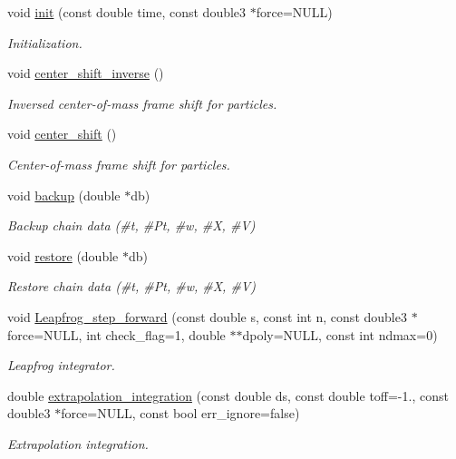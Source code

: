 \begin{DoxyCompactItemize}
void \hyperlink{classARC_1_1chain_aa016cf633d19079dca24565b80a36a3f}{init} (const double time, const double3 $\ast$force=N\+U\+LL)
\begin{DoxyCompactList}\small\item\em Initialization. \end{DoxyCompactList}\item 
void \hyperlink{classARC_1_1chain_a52edc1843550578f5be5590b7403ef97}{center\+\_\+shift\+\_\+inverse} ()
\begin{DoxyCompactList}\small\item\em Inversed center-\/of-\/mass frame shift for particles. \end{DoxyCompactList}\item 
void \hyperlink{classARC_1_1chain_a68ae268afb418455bfdd6e8101b3b4eb}{center\+\_\+shift} ()
\begin{DoxyCompactList}\small\item\em Center-\/of-\/mass frame shift for particles. \end{DoxyCompactList}\item 
void \hyperlink{classARC_1_1chain_a587009b6c6db0490c0f335aba732d77a}{backup} (double $\ast$db)
\begin{DoxyCompactList}\small\item\em Backup chain data (\#t, \#\+Pt, \#w, \#X, \#V) \end{DoxyCompactList}\item 
void \hyperlink{classARC_1_1chain_a2e7873b3a50ba9276d9a7595cb1d768d}{restore} (double $\ast$db)
\begin{DoxyCompactList}\small\item\em Restore chain data (\#t, \#\+Pt, \#w, \#X, \#V) \end{DoxyCompactList}\item 
void \hyperlink{classARC_1_1chain_a82b26731761231d86fd2e0b4529df6fa}{Leapfrog\+\_\+step\+\_\+forward} (const double s, const int n, const double3 $\ast$force=N\+U\+LL, int check\+\_\+flag=1, double $\ast$$\ast$dpoly=N\+U\+LL, const int ndmax=0)
\begin{DoxyCompactList}\small\item\em Leapfrog integrator. \end{DoxyCompactList}\item 
double \hyperlink{classARC_1_1chain_a0eb7768cb1b9099bbf66124d4c00164c}{extrapolation\+\_\+integration} (const double ds, const double toff=-\/1., const double3 $\ast$force=N\+U\+LL, const bool err\+\_\+ignore=false)
\begin{DoxyCompactList}\small\item\em Extrapolation integration. \end{DoxyCompactList}\item 
$$
\end{DoxyCompactItemize}
